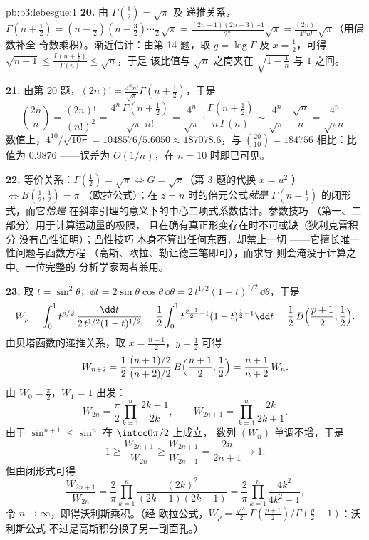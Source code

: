 \begin{solution}{pb:b3:lebesgue:1}
\textbf{20.} 由 $\Gamma(\frac12) = \sqrt\pi$ 及
递推关系，$\Gamma(n + \frac12) = (n - \frac12)(n -
\frac32)\cdots\frac12\,\sqrt\pi =
\frac{(2n-1)(2n-3)\cdots1}{2^n}\sqrt\pi =
\frac{(2n)!}{4^nn!}\sqrt\pi$（用偶数补全
奇数乘积）。渐近估计：由第 14 题，取 $g = \log\Gamma$
及 $x = \frac12$，可得 $\sqrt{n-1} \leq
\frac{\Gamma(n+\frac12)}{\Gamma(n)} \leq \sqrt n$，于是
该比值与 $\sqrt n$ 之商夹在 $\sqrt{1 - \frac1n}$
与 $1$ 之间。

\textbf{21.} 由第 20 题，$(2n)! =
\frac{4^nn!}{\sqrt\pi}\Gamma(n + \tfrac12)$，于是
\[
\binom{2n}n = \frac{(2n)!}{(n!)^2}
= \frac{4^n\,\Gamma(n+\frac12)}{\sqrt\pi\;n!}
= \frac{4^n}{\sqrt\pi}\cdot
\frac{\Gamma(n+\frac12)}{n\,\Gamma(n)}
\sim \frac{4^n}{\sqrt\pi}\cdot\frac{\sqrt n}{n}
= \frac{4^n}{\sqrt{\pi n}} .
\]
数值上，$4^{10}/\sqrt{10\pi} = 1048576/5.6050 \approx
187078.6$，与 $\binom{20}{10} = 184756$ 相比：比值为 $0.9876$
——误差为 $O(1/n)$，在 $n = 10$ 时即已可见。

\textbf{22.} 等价关系：$\Gamma(\frac12) = \sqrt\pi
\Leftrightarrow G = \sqrt\pi$（第 3 题的代换 $x = u^2$
）$\Leftrightarrow B(\frac12, \frac12) = \pi$
（欧拉公式）；在 $z = n$ 时的倍元公式\emph{就是}
$\Gamma(n + \frac12)$ 的闭形式，而它\emph{恰是}
在斜率引理的意义下的中心二项式系数估计。参数技巧
（第一、二部分）用于计算运动量的极限，
且在确有真正形变存在时不可或缺（狄利克雷积分
没有凸性证明）；凸性技巧
本身不算出任何东西，却禁止一切
——它擅长唯一性问题与函数方程
（高斯、欧拉、勒让德三笔即可），而求导
则会淹没于计算之中。一位完整的
分析学家两者兼用。

\textbf{23.} 取 $t = \sin^2\theta$，$\dd t =
2\sin\theta\cos\theta\,\dd\theta =
2\,t^{1/2}(1-t)^{1/2}\,\dd\theta$，于是
\[
W_p = \int_0^1 t^{p/2}\,
\frac{\dd t}{2\,t^{1/2}(1-t)^{1/2}}
= \frac12\int_0^1 t^{\frac{p+1}2 - 1}(1-t)^{\frac12 - 1}\dd t
= \frac12\,B\Bigl(\frac{p+1}2, \frac12\Bigr).
\]
由贝塔函数的递推关系，取 $x = \frac{n+1}2$，$y = \frac12$
可得
\[
W_{n+2} = \frac12\,
\frac{(n+1)/2}{(n+2)/2}\,B\Bigl(\frac{n+1}2, \frac12\Bigr)
= \frac{n+1}{n+2}\,W_n .
\]
由 $W_0 = \frac\pi2$，$W_1 = 1$ 出发：
\[
W_{2n} = \frac\pi2\prod_{k=1}^n\frac{2k-1}{2k},
\qquad
W_{2n+1} = \prod_{k=1}^n\frac{2k}{2k+1} .
\]
由于 $\sin^{n+1} \leq \sin^n$ 在 $\intcc0{\pi/2}$ 上成立，
数列 $(W_n)$ 单调不增，于是
\[
1 \geq \frac{W_{2n+1}}{W_{2n}} \geq
\frac{W_{2n+1}}{W_{2n-1}} = \frac{2n}{2n+1}
\longrightarrow 1 .
\]
但由闭形式可得
\[
\frac{W_{2n+1}}{W_{2n}} = \frac2\pi
\prod_{k=1}^n\frac{(2k)^2}{(2k-1)(2k+1)}
= \frac2\pi\prod_{k=1}^n\frac{4k^2}{4k^2-1},
\]
令 $n \to \infty$，即得沃利斯乘积。（经
欧拉公式，$W_p = \frac{\sqrt\pi}2\,
\Gamma(\frac{p+1}2)/\Gamma(\frac p2 + 1)$：沃利斯公式
不过是高斯积分换了另一副面孔。）


\end{solution}
